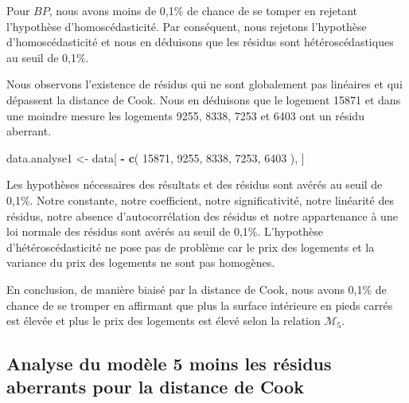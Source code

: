 \documentclass[
  11pt,
  french,
]{article}
\newenvironment{Shaded}{\begin{snugshade}}{\end{snugshade}}
\newcommand{\DecValTok}[1]{\textcolor[rgb]{0.00,0.00,0.81}{#1}}
\newcommand{\KeywordTok}[1]{\textcolor[rgb]{0.13,0.29,0.53}{\textbf{#1}}}
\newcommand{\NormalTok}[1]{#1}
\newcommand{\OperatorTok}[1]{\textcolor[rgb]{0.81,0.36,0.00}{\textbf{#1}}}
\newcommand{\StringTok}[1]{\textcolor[rgb]{0.31,0.60,0.02}{#1}}
\begin{document}
Pour \(BP\), nous avons moins de 0,1\% de chance de se tomper en
rejetant l'hypothèse d'homoscédasticité. Par conséquent, nous rejetons
l'hypothèse d'homoscédasticité et nous en déduisons que les résidus sont
hétéroscédastiques au seuil de 0,1\%.

Nous observons l'existence de résidus qui ne sont globalement pas
linéaires et qui dépassent la distance de Cook. Nous en déduisons que le
logement 15871 et dans une moindre mesure les logements 9255, 8338, 7253
et 6403 ont un résidu aberrant.

\begin{Shaded}
\begin{Highlighting}[]
\NormalTok{data.analyse1 <-}\StringTok{ }\NormalTok{data[ }\OperatorTok{-}\StringTok{ }\KeywordTok{c}\NormalTok{( }\DecValTok{15871}\NormalTok{,}
                            \DecValTok{9255}\NormalTok{,}
                            \DecValTok{8338}\NormalTok{,}
                            \DecValTok{7253}\NormalTok{,}
                            \DecValTok{6403}\NormalTok{ ), ]}
\end{Highlighting}
\end{Shaded}

Les hypothèses nécessaires des résultats et des résidus sont avérés au
seuil de 0,1\%. Notre constante, notre coefficient, notre
significativité, notre linéarité des résidus, notre absence
d'autocorrélation des résidus et notre appartenance à une loi normale
des résidus sont avérés au seuil de 0,1\%. L'hypothèse
d'hétéroscédasticité ne pose pas de problème car le prix des logements
et la variance du prix des logements ne sont pas homogènes.

En conclusion, de manière biaisé par la distance de Cook, nous avons
0,1\% de chance de se tromper en affirmant que plus la surface
intérieure en pieds carrés est élevée et plus le prix des logements est
élevé selon la relation \(\mathcal{M}_{5}\).

\newpage

\hypertarget{analyse-du-moduxe8le-5-moins-les-ruxe9sidus-aberrants-pour-la-distance-de-cook}{%
\subsection{Analyse du modèle 5 moins les résidus aberrants pour la
distance de
Cook}\label{analyse-du-moduxe8le-5-moins-les-ruxe9sidus-aberrants-pour-la-distance-de-cook}}
\end{document}
